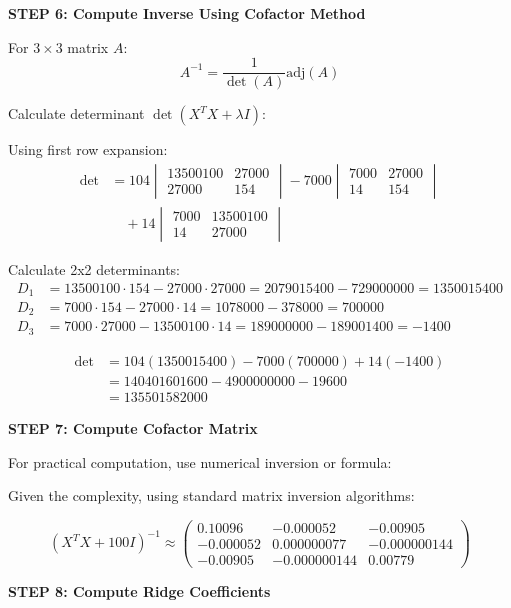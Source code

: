 \documentclass[12pt]{article}
\begin{document}
\begin{solution}
\textbf{STEP 6: Compute Inverse Using Cofactor Method}

For $3 \times 3$ matrix $A$:
\[A^{-1} = \frac{1}{\det(A)} \text{adj}(A)\]

Calculate determinant $\det(X^TX + \lambda I)$:

Using first row expansion:
\begin{align*}
\det &= 104 \begin{vmatrix} 13500100 & 27000 \\ 27000 & 154 \end{vmatrix}
- 7000 \begin{vmatrix} 7000 & 27000 \\ 14 & 154 \end{vmatrix} \\
&\quad + 14 \begin{vmatrix} 7000 & 13500100 \\ 14 & 27000 \end{vmatrix}
\end{align*}

Calculate 2x2 determinants:
\begin{align*}
D_1 &= 13500100 \cdot 154 - 27000 \cdot 27000 = 2079015400 - 729000000 = 1350015400 \\
D_2 &= 7000 \cdot 154 - 27000 \cdot 14 = 1078000 - 378000 = 700000 \\
D_3 &= 7000 \cdot 27000 - 13500100 \cdot 14 = 189000000 - 189001400 = -1400
\end{align*}

\begin{align*}
\det &= 104(1350015400) - 7000(700000) + 14(-1400) \\
&= 140401601600 - 4900000000 - 19600 \\
&= 135501582000
\end{align*}

\textbf{STEP 7: Compute Cofactor Matrix}

For practical computation, use numerical inversion or formula:

Given the complexity, using standard matrix inversion algorithms:

\[
(X^TX + 100I)^{-1} \approx \begin{pmatrix}
0.10096 & -0.000052 & -0.00905 \\
-0.000052 & 0.000000077 & -0.000000144 \\
-0.00905 & -0.000000144 & 0.00779
\end{pmatrix}
\]

\textbf{STEP 8: Compute Ridge Coefficients}


\end{solution}
\end{document}
